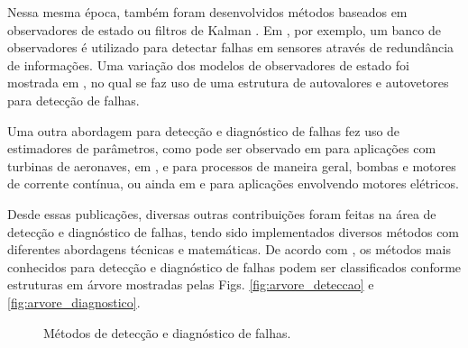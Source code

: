 Nessa mesma época, também foram desenvolvidos métodos baseados em observadores
de estado ou filtros de Kalman \cite{beard:1971,mehra:1971,jones:1973}. Em
, por exemplo, um banco de observadores é utilizado para
detectar falhas em sensores através de redundância de informações. Uma variação
dos modelos de observadores de estado foi mostrada em ,
no qual se faz uso de uma estrutura de autovalores e autovetores para detecção
de falhas.

Uma outra abordagem para detecção e diagnóstico de falhas fez uso de estimadores
de parâmetros, como pode ser observado em  para
aplicações com turbinas de aeronaves, em ,
 e  para processos de
maneira geral, bombas e motores de corrente contínua, ou ainda em
 e  para aplicações envolvendo
motores elétricos.

Desde essas publicações, diversas outras contribuições foram feitas na área de
detecção e diagnóstico de falhas, tendo sido implementados diversos métodos com
diferentes abordagens técnicas e matemáticas. De acordo com
, os métodos mais conhecidos para detecção e
diagnóstico de falhas podem ser classificados conforme estruturas em árvore
mostradas pelas Figs. \ref{fig:arvore_deteccao} e \ref{fig:arvore_diagnostico}.

\begin{figure}[htb]
\centering
    \caption{Métodos de detecção e diagnóstico de falhas.}
    \label{fig:arvores_isermann}
\end{figure}

